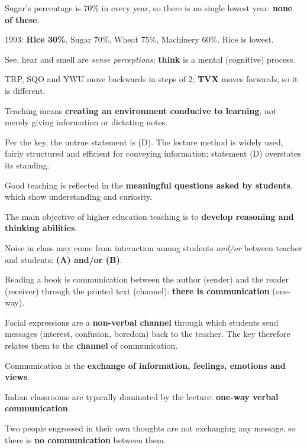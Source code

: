 Sugar's percentage is 70\% in every year, so there is no single lowest year: \textbf{none of these}.

1993: \textbf{Rice 30\%}, Sugar 70\%, Wheat 75\%, Machinery 60\%. Rice is lowest.

See, hear and smell are \emph{sense perceptions}; \textbf{think} is a mental (cognitive) process.

TRP, SQO and YWU move backwards in steps of 2; \textbf{TVX} moves forwards, so it is different.

Teaching means \textbf{creating an environment conducive to learning}, not merely giving information or dictating notes.

Per the key, the untrue statement is (D). The lecture method is widely used, fairly structured and efficient for conveying information; statement (D) overstates its standing.

Good teaching is reflected in the \textbf{meaningful questions asked by students}, which show understanding and curiosity.

The main objective of higher education teaching is to \textbf{develop reasoning and thinking abilities}.

Noise in class may come from interaction among students \emph{and/or} between teacher and students: \textbf{(A) and/or (B)}.

Reading a book is communication between the author (sender) and the reader (receiver) through the printed text (channel): \textbf{there is communication} (one-way).

Facial expressions are a \textbf{non-verbal channel} through which students send messages (interest, confusion, boredom) back to the teacher. The key therefore relates them to the \textbf{channel} of communication.

Communication is the \textbf{exchange of information, feelings, emotions and views}.

Indian classrooms are typically dominated by the lecture: \textbf{one-way verbal communication}.

Two people engrossed in their own thoughts are not exchanging any message, so there is \textbf{no communication} between them.
